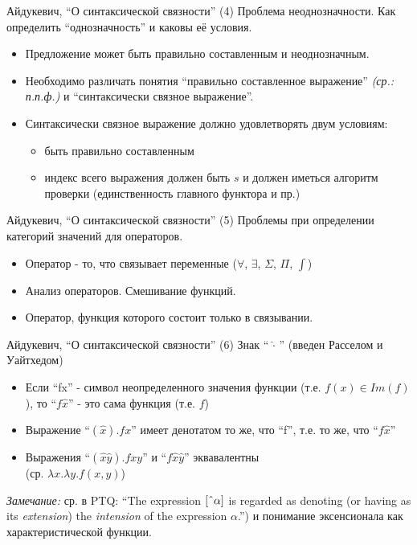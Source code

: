 \documentclass{beamer}
\begin{document}
\begin{frame}{Айдукевич, ``О синтаксической связности'' (4)}
Проблема неоднозначности. Как определить ``однозначность'' и каковы её условия.\\
\bigskip
\begin{itemize}
  \item Предложение может быть правильно составленным и неоднозначным.
  \item Необходимо различать понятия ``правильно составленное выражение'' \textit{(ср.: п.п.ф.)} и ``синтаксически связное выражение''.
  \item Синтаксически связное выражение должно удовлетворять двум условиям:
    \begin{itemize}
      \item быть правильно составленным 
      \item индекс всего выражения должен быть $s$ и должен иметься алгоритм проверки (единственность главного функтора и пр.)
    \end{itemize}
\end{itemize}
\end{frame}

\begin{frame}{Айдукевич, ``О синтаксической связности'' (5)}
Проблемы при определении категорий значений для операторов.\\
\bigskip
\begin{itemize}
  \item Оператор - то, что связывает переменные ($\forall$, $\exists$, $\Sigma$, $\Pi$, $\int$)
  \item Анализ операторов. Смешивание функций. 
  \item Оператор, функция которого состоит только в связывании.
\end{itemize}
\end{frame}

\begin{frame}{Айдукевич, ``О синтаксической связности'' (6)}
Знак ``$\,\hat{\cdot}\,$'' (введен Расселом и Уайтхедом)\\
\bigskip
\begin{itemize}
  \item Если ``fx'' - символ неопределенного значения функции (т.е. $f(x) \in Im(f)$), то ``$f\hat{x}$'' - это сама функция (т.е. $f$) 
  \item Выражение ``$(\hat{x}).fx$'' имеет денотатом то же, что ``f'', т.е. то же, что ``$f\hat{x}$''
  \item Выражения ``$(\hat{x}\hat{y}).fxy$'' и ``$f\hat{x}\hat{y}$'' эквавалентны \\(ср. $\lambda x.\lambda y.f(x,y)$)
\end{itemize}
\bigskip
\textit{Замечание:} ср. в PTQ: ``The expression $[\string^\alpha]$ is regarded as denoting (or having as its \textit{extension}) the \textit{intension} of the expression $\alpha$.'') и понимание эксенсионала как характеристической функции.
\end{frame}
\end{document}

